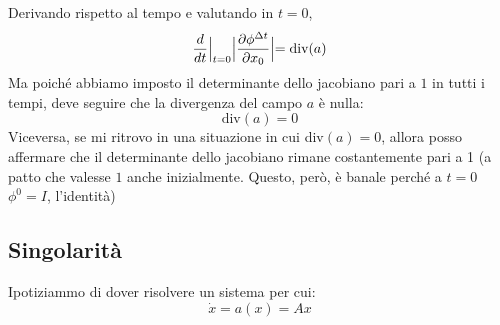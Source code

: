\documentclass[a4paper,openany]{article}
\begin{document}
	Derivando rispetto al tempo e valutando in $t=0$,
	$$
	\dfrac{d}{dt}\Bigl|_{t=0}	\Bigl|\dfrac{\partial \phi^{\Delta t}}{\partial x_{0}}\Bigl| = \mbox{div}(a)
	$$
	Ma poiché abbiamo imposto il determinante dello jacobiano pari a $1$ in tutti i tempi, deve seguire che la divergenza del campo $a$ è nulla:
	\begin{equation}
		\mbox{div}(a) = 0
	\end{equation}
	Viceversa, se mi ritrovo in una situazione in cui div$(a) = 0$, allora posso affermare che il determinante dello jacobiano rimane costantemente pari a 1 (a patto che valesse $1$ anche inizialmente. Questo, però, è banale perché a $t=0$ $\phi^{0} = I$, l'identità)
	\subsection{Singolarità}
	Ipotiziammo di dover risolvere un sistema per cui:
	\begin{equation}
		\dot{x} = a(x) = Ax
		\label{eq34}
	\end{equation}
	
\end{document}
